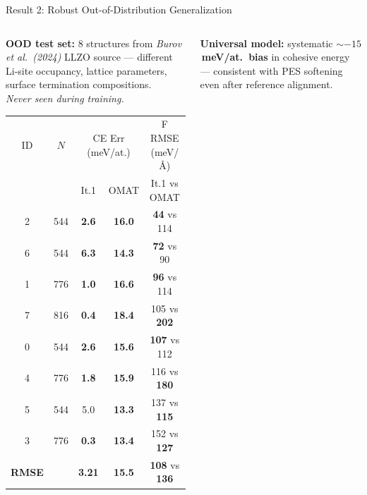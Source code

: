 \documentclass[aspectratio=169,10pt]{beamer}
\newcommand{\wintext}[1]{\textcolor{wincolor}{\textbf{#1}}}
\newcommand{\badtext}[1]{\textcolor{badcolor}{\textbf{#1}}}
\begin{document}
\begin{frame}{Result 2: Robust Out-of-Distribution Generalization}
\begin{columns}[T]
  \begin{column}{0.52\textwidth}
    \textbf{OOD test set:} 8 structures from
    \textit{Burov et al.\ (2024)} LLZO source — different Li-site occupancy,
    lattice parameters, surface termination compositions.\\
    \textit{Never seen during training.}\\[0.4em]

    {\footnotesize
    \begin{tabular}{ccccc}
      \toprule
      ID & $N$ & \multicolumn{2}{c}{CE Err (meV/at.)} & F RMSE (meV/\AA) \\
      \cmidrule(lr){3-4}
      & & It.1 & OMAT & It.1 vs OMAT \\
      \midrule
      2 & 544 & \wintext{2.6} & \badtext{16.0} & \wintext{44} vs 114 \\
      6 & 544 & \wintext{6.3} & \badtext{14.3} & \wintext{72} vs 90 \\
      1 & 776 & \wintext{1.0} & \badtext{16.6} & \wintext{96} vs 114 \\
      7 & 816 & \wintext{0.4} & \badtext{18.4} & 105 vs \badtext{202} \\
      0 & 544 & \wintext{2.6} & \badtext{15.6} & \wintext{107} vs 112 \\
      4 & 776 & \wintext{1.8} & \badtext{15.9} & 116 vs \badtext{180} \\
      5 & 544 & 5.0 & \badtext{13.3} & 137 vs \badtext{115} \\
      3 & 776 & \wintext{0.3} & \badtext{13.4} & 152 vs \badtext{127} \\
      \midrule
      \textbf{RMSE} & & \wintext{\textbf{3.21}} & \badtext{\textbf{15.5}} &
                      \wintext{\textbf{108}} vs \badtext{\textbf{136}} \\
      \bottomrule
    \end{tabular}}
  \end{column}
  \begin{column}{0.46\textwidth}
    \textbf{Universal model:} systematic \badtext{$\sim$$-15$\,meV/at.\ bias} in
    cohesive energy — consistent with PES softening even after reference alignment.\\[0.4em]


\end{column}
\end{columns}
\end{frame}
\end{document}
